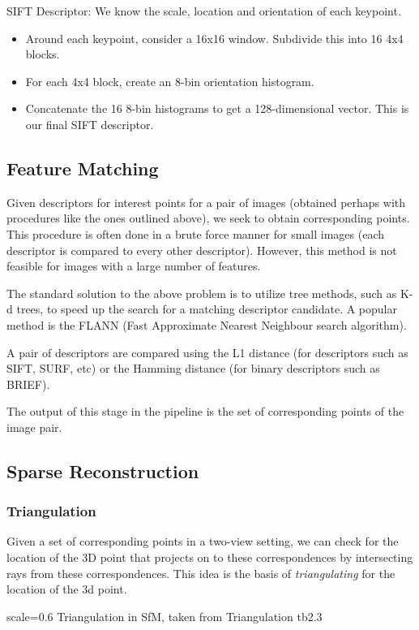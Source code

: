 SIFT Descriptor: We know the scale, location and orientation of each keypoint. 
\begin{itemize}
	\item Around each keypoint, consider a 16x16 window. Subdivide this into 16 4x4 blocks.
	\item For each 4x4 block, create an 8-bin orientation histogram. 
	\item Concatenate the 16 8-bin histograms to get a 128-dimensional vector. This is our final SIFT descriptor. 
\end{itemize}

\subsection{Feature Matching}
Given descriptors for interest points for a pair of images (obtained perhaps with procedures like the ones outlined above), we seek to obtain corresponding points. This procedure is often done in a brute force manner for small images (each descriptor is compared to every other descriptor). However, this method is not feasible for images with a large number of features.

The standard solution to the above problem is to utilize tree methods, such as K-d trees, to speed up the search for a matching descriptor candidate. A popular method is the FLANN (Fast Approximate Nearest Neighbour search algorithm).

A pair of descriptors are compared using the L1 distance (for descriptors such as SIFT, SURF, etc) or the Hamming distance (for binary descriptors such as BRIEF).

The output of this stage in the pipeline is the set of corresponding points of the image pair. 

\subsection{Sparse Reconstruction}
\subsubsection{Triangulation}
Given a set of corresponding points in a two-view setting, we can check for the location of the 3D point that projects on to these correspondences by intersecting rays from these correspondences. This idea is the basis of \emph{triangulating} for the location of the 3d point.

{scale=0.6}%
{Triangulation in SfM, taken from \cite{schoenberger2018}}%
{Triangulation}%
{tb2.3}

